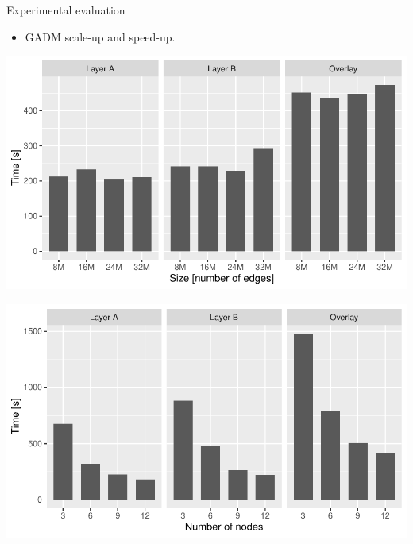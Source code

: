     \begin{frame}{Experimental evaluation}
        \begin{itemize}
            \item GADM scale-up and speed-up.
        \end{itemize}
        \vspace{1cm}

        \begin{minipage}{0.49\textwidth}
            \centering
            \includegraphics[width=\textwidth]{figures/GADM_scaleup}
        \end{minipage}\hfill %
        \begin{minipage}{0.49\textwidth}
            \centering
            \includegraphics[width=\textwidth]{figures/GADM_speedup}
        \end{minipage}
    \end{frame}

